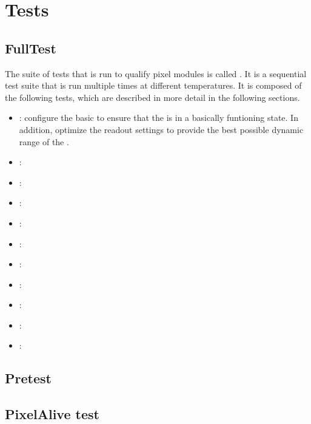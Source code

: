 \section{Tests}
\label{s:tests}


\subsection{FullTest}
\label{ss:fulltest}

The suite of tests that is run to qualify pixel modules is called
\fulltest. It is a sequential test suite that is run multiple times at
different temperatures. It is composed of the following tests, which
are described in more detail in the following sections.
\begin{itemize}
  \item \pretest: configure the basic \dacs to ensure that the \roc is
    in a basically funtioning state. In addition, optimize the readout
    settings to provide the best possible dynamic range of the \ph. 
  \item \alivetest: 
  \item \masktest:
  \item \bbtest:
  \item \trimbits:
  \item \trimming:
  \item \scurves:
  \item \thrMaps:
  \item \phcalibration:
  \item \vcalcal:
  \item \hrmaps:
\end{itemize}


\subsection{Pretest}
\label{ss:pretest}

\subsection{PixelAlive test}
\label{ss:alivetest}

